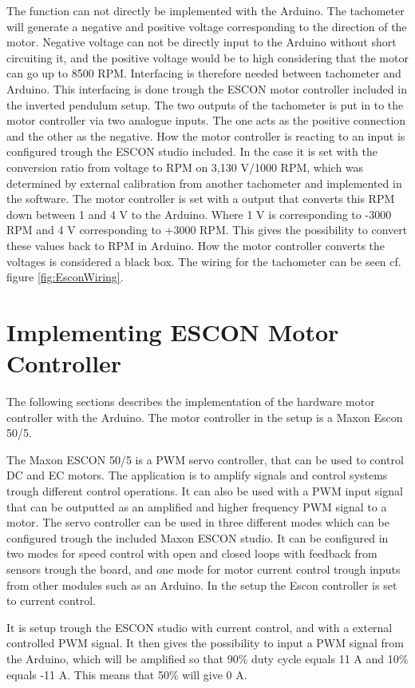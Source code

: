 The function can not directly be implemented with the Arduino. The tachometer will generate a negative and positive voltage corresponding to the direction of the motor. Negative voltage can not be directly input to the Arduino without short circuiting it, and the positive voltage would be to high considering that the motor can go up to 8500 RPM. Interfacing is therefore needed between tachometer and Arduino.
This interfacing is done trough the ESCON motor controller included in the inverted pendulum setup. The two outputs of the tachometer is put in to the motor controller via two analogue inputs. The one acts as the positive connection and the other as the negative. How the motor controller is reacting to an input is configured trough the ESCON studio included. In the case it is set with the conversion ratio from voltage to RPM on 3,130 V/1000 RPM, which was determined by external calibration from another tachometer and implemented in the software.  The motor controller is set with a output that converts this RPM down between 1 and 4 V to the Arduino. Where 1 V is corresponding to -3000 RPM and 4 V corresponding to +3000 RPM. This gives the possibility to convert these values back to RPM in Arduino. How the motor controller converts the voltages is considered a black box. The wiring for the tachometer can be seen cf. figure \ref{fig:EsconWiring}. 


\section{Implementing ESCON Motor Controller}
The following sections describes the implementation of the hardware motor controller with the Arduino. The motor controller in the setup is a Maxon Escon 50/5.

The Maxon ESCON 50/5 is a PWM servo controller, that can be used to control DC and EC motors. The application is to amplify signals and control systems trough different control operations. It can also be used with a PWM input signal that can be outputted as an amplified and higher frequency PWM signal to a motor. The servo controller can be used in three different modes which can be configured trough the included Maxon ESCON studio. It can be configured in two modes for speed control with open and closed loops with feedback from sensors trough the board, and one mode for motor current control trough inputs from other modules such as an Arduino. In the setup the Escon controller is set to current control.


It is setup trough the ESCON studio with current control, and with a external controlled PWM signal. It then gives the possibility to input a PWM signal from the Arduino, which will be amplified so that 90\% duty cycle equals 11 A and 10\% equals -11 A. This means that 50\% will give 0 A.


